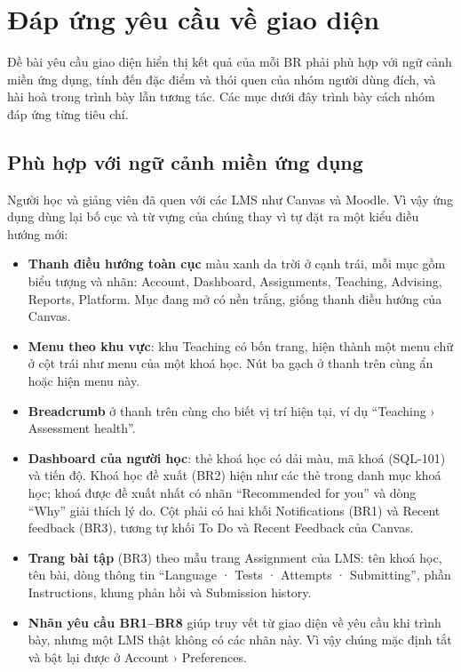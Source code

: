 \section{Đáp ứng yêu cầu về giao diện}
\label{sec:ui-criteria}

Đề bài yêu cầu giao diện hiển thị kết quả của mỗi BR phải phù hợp với ngữ cảnh miền ứng dụng, tính đến đặc điểm và thói quen của nhóm người dùng đích, và hài hoà trong trình bày lẫn tương tác. Các mục dưới đây trình bày cách nhóm đáp ứng từng tiêu chí.

\subsection{Phù hợp với ngữ cảnh miền ứng dụng}

Người học và giảng viên đã quen với các LMS như Canvas và Moodle. Vì vậy ứng dụng dùng lại bố cục và từ vựng của chúng thay vì tự đặt ra một kiểu điều hướng mới:
\begin{itemize}
  \item \textbf{Thanh điều hướng toàn cục} màu xanh da trời ở cạnh trái, mỗi mục gồm biểu tượng và nhãn: Account, Dashboard, Assignments, Teaching, Advising, Reports, Platform. Mục đang mở có nền trắng, giống thanh điều hướng của Canvas.
  \item \textbf{Menu theo khu vực}: khu Teaching có bốn trang, hiện thành một menu chữ ở cột trái như menu của một khoá học. Nút ba gạch ở thanh trên cùng ẩn hoặc hiện menu này.
  \item \textbf{Breadcrumb} ở thanh trên cùng cho biết vị trí hiện tại, ví dụ ``Teaching › Assessment health''.
  \item \textbf{Dashboard của người học}: thẻ khoá học có dải màu, mã khoá (SQL-101) và tiến độ. Khoá học đề xuất (BR2) hiện như các thẻ trong danh mục khoá học; khoá được đề xuất nhất có nhãn ``Recommended for you'' và dòng ``Why'' giải thích lý do. Cột phải có hai khối Notifications (BR1) và Recent feedback (BR3), tương tự khối To Do và Recent Feedback của Canvas.
  \item \textbf{Trang bài tập} (BR3) theo mẫu trang Assignment của LMS: tên khoá học, tên bài, dòng thông tin ``Language · Tests · Attempts · Submitting'', phần Instructions, khung phản hồi và Submission history.
  \item \textbf{Nhãn yêu cầu BR1--BR8} giúp truy vết từ giao diện về yêu cầu khi trình bày, nhưng một LMS thật không có các nhãn này. Vì vậy chúng mặc định tắt và bật lại được ở Account › Preferences.
\end{itemize}

